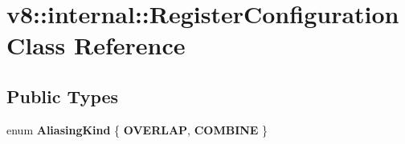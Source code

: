 \hypertarget{classv8_1_1internal_1_1RegisterConfiguration}{}\section{v8\+:\+:internal\+:\+:Register\+Configuration Class Reference}
\label{classv8_1_1internal_1_1RegisterConfiguration}
\subsection*{Public Types}
\begin{DoxyCompactItemize}
\item 
\mbox{\label{classv8_1_1internal_1_1RegisterConfiguration_a8a6492334216887c82e6830b51c403ae}} 
enum {\bfseries Aliasing\+Kind} \{ {\bfseries O\+V\+E\+R\+L\+AP}, 
{\bfseries C\+O\+M\+B\+I\+NE}
 \}
\end{DoxyCompactItemize}
